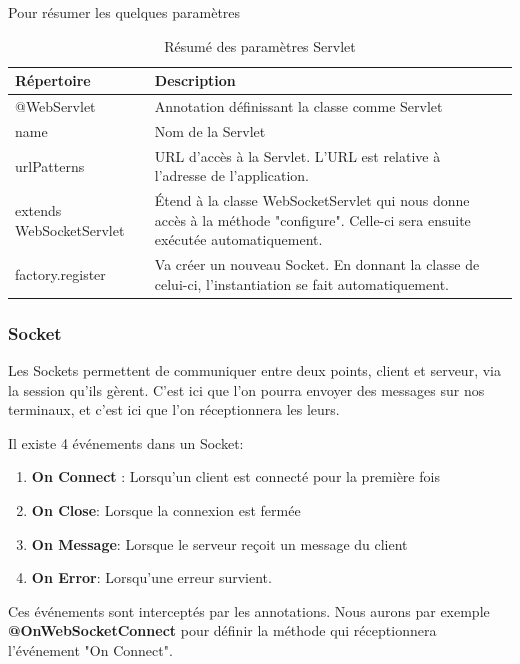 Pour résumer les quelques paramètres

\begin{table}[H]
\begin{tabularx}{\textwidth}{|m{3cm}|X|l|}
  \hline
  \bf{Répertoire} & \bf{Description} \\
  \hline
  @WebServlet & Annotation définissant la classe comme Servlet \\
  \hline  
  name & Nom de la Servlet\\
  \hline  
  urlPatterns & URL d'accès à la Servlet. L'URL est relative à l'adresse de l'application.\\
  \hline  
  extends WebSocketServlet & Étend à la classe WebSocketServlet qui nous donne accès à la méthode "configure". Celle-ci sera ensuite exécutée automatiquement.\\
  \hline  
  factory.register & Va créer un nouveau Socket. En donnant la classe de celui-ci, l'instantiation se fait automatiquement. \\
  \hline
\end{tabularx}
\caption{Résumé des paramètres Servlet}
\label{tab:classDiagram}
\end{table}

\subsubsection{Socket}

Les Sockets permettent de communiquer entre deux points, client et serveur, via la session qu'ils gèrent. C'est ici que l'on pourra envoyer des messages sur nos terminaux, et c'est ici que l'on réceptionnera les leurs.

\medskip

Il existe 4 événements dans un Socket:
\begin{enumerate}
	\item \textbf{On Connect} : Lorsqu'un client est connecté pour la première fois
	\item \textbf{On Close}: Lorsque la connexion est fermée
	\item \textbf{On Message}: Lorsque le serveur reçoit un message du client
	\item \textbf{On Error}: Lorsqu'une erreur survient.
\end{enumerate}

Ces événements sont interceptés par les annotations. Nous aurons par exemple \textbf{@OnWebSocketConnect} pour définir la méthode qui réceptionnera l'événement "On Connect".

